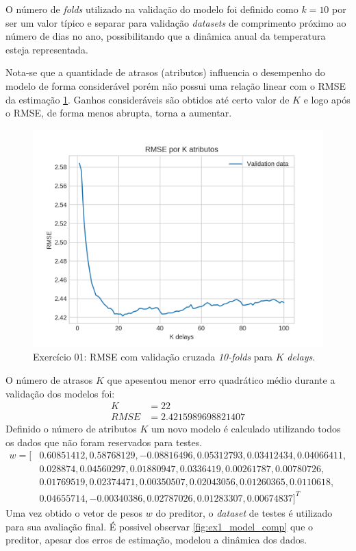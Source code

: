 \documentclass{article}
\begin{document}
    O número de \textit{folds} utilizado na validação do modelo foi definido como $k=10$ por ser um valor
    típico e separar para validação \textit{datasets} de comprimento próximo ao número de dias no ano,
    possibilitando que a dinâmica anual da temperatura esteja representada. 
    
    Nota-se que a quantidade de atrasos (atributos) influencia o desempenho do modelo de forma considerável
    porém não possui uma relação linear com o RMSE da estimação \ref{fig:ex1_kfold_rmse}. Ganhos consideráveis são obtidos até certo
    valor de $K$ e logo após o RMSE, de forma menos abrupta, torna a aumentar.
    \begin{figure}[!h]
        \centering
        \includegraphics[width=\linewidth]{ex01/folds.png}
        \caption{Exercício 01: RMSE com validação cruzada \textit{10-folds} para $K$ \textit{delays}.}
        \label{fig:ex1_kfold_rmse}
    \end{figure}
    O número de atrasos $K$ que apesentou menor erro quadrático médio durante a validação dos modelos foi:
    \begin{align}
        K&=22\\
        RMSE&=2.4215989698821407
    \end{align}
    Definido o número de atributos $K$ um novo modelo é calculado
    utilizando todos os dados que não foram reservados para testes.
    \begin{align*}
w=[ &0.60851412, 0.58768129, -0.08816496, 0.05312793, 0.03412434, 0.04066411, \\
    &0.028874  , 0.04560297,  0.01880947, 0.0336419,  0.00261787, 0.00780726, \\
    &0.01769519, 0.02374471,  0.00350507,  0.02043056,0.01260365, 0.0110618,  \\
    & 0.04655714, -0.00340386,  0.02787026,  0.01283307,  0.00674837]^T
    \end{align*}
    Uma vez obtido o vetor de pesos $w$ do preditor, o \textit{dataset} de testes é utilizado para
    sua avaliação final. É possivel observar \ref{fig:ex1_model_comp} que o preditor, apesar dos erros de estimação, modelou a dinâmica dos dados.
    
\end{document}
